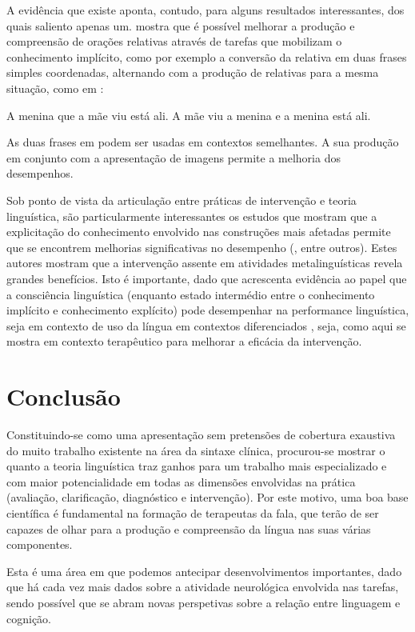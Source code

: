 \documentclass[output=paper,colorlinks,citecolor=brown,booklanguage=portuguese]{langscibook}
\begin{document}
A evidência que existe aponta, contudo, para alguns resultados interessantes, dos quais saliento apenas um. \citet{Roth1984} mostra que é possível melhorar a produção e compreensão de orações relativas através de tarefas que mobilizam o conhecimento implícito, como por exemplo a conversão da relativa em duas frases simples coordenadas, alternando com a produção de relativas para a mesma situação, como em :

\ea\label{ex:cap2ex36}
        \ea A menina que a mãe viu está ali.
        \ex A mãe viu a menina e a menina está ali.
    \z
\z

As duas frases em  podem ser usadas em contextos semelhantes. A sua produção em conjunto com a apresentação de imagens permite a melhoria dos desempenhos.

Sob ponto de vista da articulação entre práticas de intervenção e teoria linguística, são particularmente interessantes os estudos que mostram que a explicitação do conhecimento envolvido nas construções mais afetadas permite que se encontrem melhorias significativas no desempenho (\citet{Nickels1991, Schwartz1994, Shapiro2006, Levy2009}, entre outros). Estes autores mostram que a intervenção assente em atividades metalinguísticas revela grandes benefícios. Isto é importante, dado que acrescenta evidência ao papel que a consciência linguística (enquanto estado intermédio entre o conhecimento implícito e conhecimento explícito) pode desempenhar na performance linguística, seja em contexto de uso da língua em contextos diferenciados \citep{Duarte2008}, seja, como aqui se mostra em contexto terapêutico para melhorar a eficácia da intervenção.


\section{Conclusão}
Constituindo-se como uma apresentação sem pretensões de cobertura exaustiva do muito trabalho existente na área da sintaxe clínica, procurou-se mostrar o quanto a teoria linguística traz ganhos para um trabalho mais especializado e com maior potencialidade em todas as dimensões envolvidas na prática (avaliação, clarificação, diagnóstico e intervenção). Por este motivo, uma boa base científica é fundamental na formação de terapeutas da fala, que terão de ser capazes de olhar para a produção e compreensão da língua nas suas várias componentes.

Esta é uma área em que podemos antecipar desenvolvimentos importantes, dado que há cada vez mais dados sobre a atividade neurológica envolvida nas tarefas, sendo possível que se abram novas perspetivas sobre a relação entre linguagem e cognição.


{\sloppy\printbibliography[heading=subbibliography,notkeyword=this]}
\end{document}
